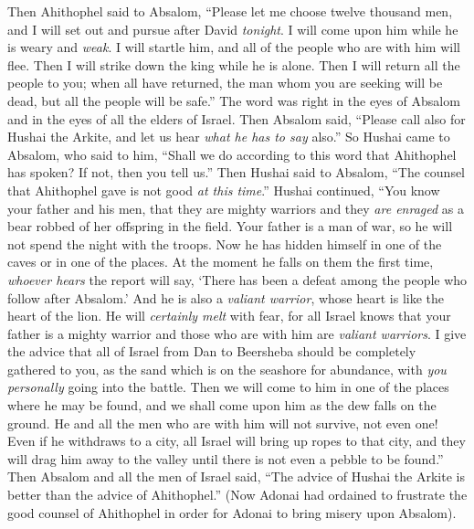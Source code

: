 \begin{biblechapter} %
 Then Ahithophel said to Absalom, “Please let me choose twelve thousand men, and I will set out and pursue after David \textit{tonight}.
\verse I will come upon him while he is weary and \textit{weak}. I will startle him, and all of the people who are with him will flee. Then I will strike down the king while he is alone.
\verse Then I will return all the people to you; when all have returned, the man whom you are seeking will be dead, but all the people will be safe.”
\verse The word was right in the eyes of Absalom and in the eyes of all the elders of Israel.
\verse Then Absalom said, “Please call also for Hushai the Arkite, and let us hear \textit{what he has to say} also.”
\verse So Hushai came to Absalom, who said to him, “Shall we do according to this word that Ahithophel has spoken? If not, then you tell us.”
\verse Then Hushai said to Absalom, “The counsel that Ahithophel gave is not good \textit{at this time}.”
\verse Hushai continued, “You know your father and his men, that they are mighty warriors and they \textit{are enraged} as a bear robbed of her offspring in the field. Your father is a man of war, so he will not spend the night with the troops.
\verse Now he has hidden himself in one of the caves or in one of the places. At the moment he falls on them the first time, \textit{whoever hears} the report will say, ‘There has been a defeat among the people who follow after Absalom.’
\verse And he is also a \textit{valiant warrior}, whose heart is like the heart of the lion. He will \textit{certainly melt} with fear, for all Israel knows that your father is a mighty warrior and those who are with him are \textit{valiant warriors}.
\verse I give the advice that all of Israel from Dan to Beersheba should be completely gathered to you, as the sand which is on the seashore for abundance, with \textit{you personally} going into the battle.
\verse Then we will come to him in one of the places where he may be found, and we shall come upon him as the dew falls on the ground. He and all the men who are with him will not survive, not even one!
\verse Even if he withdraws to a city, all Israel will bring up ropes to that city, and they will drag him away to the valley until there is not even a pebble to be found.”
\verse Then Absalom and all the men of Israel said, “The advice of Hushai the Arkite is better than the advice of Ahithophel.” (Now Adonai had ordained to frustrate the good counsel of Ahithophel in order for Adonai to bring misery upon Absalom).

\end{biblechapter}
